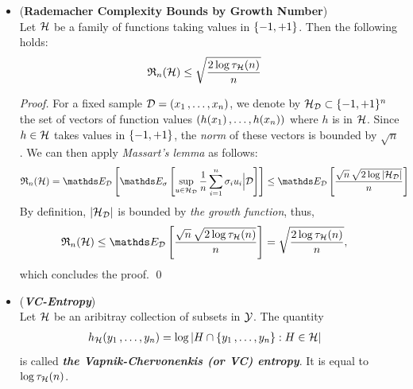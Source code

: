 \documentclass[11pt]{article}
\begin{document}
\begin{itemize}
\item \begin{corollary} \label{cor: Rademacher_growth} (\textbf{Rademacher Complexity Bounds by Growth Number}) \citep{mohri2018foundations}\\
Let ${\mathcal H}$ be a family of functions taking values in $\left\{-1, +1\right\}$. Then the following holds:
\begin{align}
{\mathfrak R}_{n}({\mathcal H}) &\le \sqrt{\frac{2 \log \tau_{{\mathcal H}}(n)}{n}} \label{eqn: growth_number_Rademacher_comp}
\end{align}
\end{corollary}
\begin{proof}
For a fixed sample ${\mathcal D} = (x_1 \,{,}\ldots{,}\, x_n)$, we denote by ${\mathcal H}_{{\mathcal D}} \subset \{-1, +1\}^{n}$ the set of vectors of function values $(h(x_1) \,{,}\ldots{,}\, h(x_n))$ where $h$ is in ${\mathcal H}$. Since $h\in {\mathcal H}$ takes values in $\left\{-1, +1\right\}$, the \emph{norm} of these vectors is bounded by $\sqrt{n}$. We can then apply
\emph{Massart's lemma} as follows:
\begin{align*}
\frR_{n}(\cH) &= \E{\cD}{\E{\sigma}{\sup_{u \in \cH_{\cD}}\frac{1}{n}\sum_{i=1}^{n}\sigma_i u_i \Big| \cD}} \le  \E{\cD}{\frac{\sqrt{n}\,\sqrt{2 \log\abs{\cH_{\cD}}}}{n}}
\end{align*}
By definition, $\left\lvert {\mathcal H}_{{\mathcal D}} \right\rvert$ is bounded by \emph{the growth function}, thus,
\begin{align*}
\frR_{n}(\cH)  &\le  \E{\cD}{\frac{\sqrt{n}\,\sqrt{2 \log \tau_{\cH}(n)}}{n}} = \sqrt{\frac{2 \log \tau_{\cH}(n)}{n}},
\end{align*}
which concludes the proof. \qed
\end{proof}

\item \begin{definition}(\textbf{\emph{VC-Entropy}})\\
Let ${\mathcal H}$ be an aribitray collection of subsets in ${\mathcal Y}$. The quantity 
\begin{align*}
h_{{\mathcal H}}(y_1 \,{,}\ldots{,}\, y_n) &= \log \left\lvert H \cap \left\{y_1 \,{,}\ldots{,}\, y_n\right\}: H \in {\mathcal H} \right\rvert
\end{align*}
 is called \textbf{\emph{the Vapnik-Chervonenkis (or VC) entropy}}. It is equal to $\log \tau_{{\mathcal H}}(n)$.
\end{definition}
\end{itemize}
\end{document}
